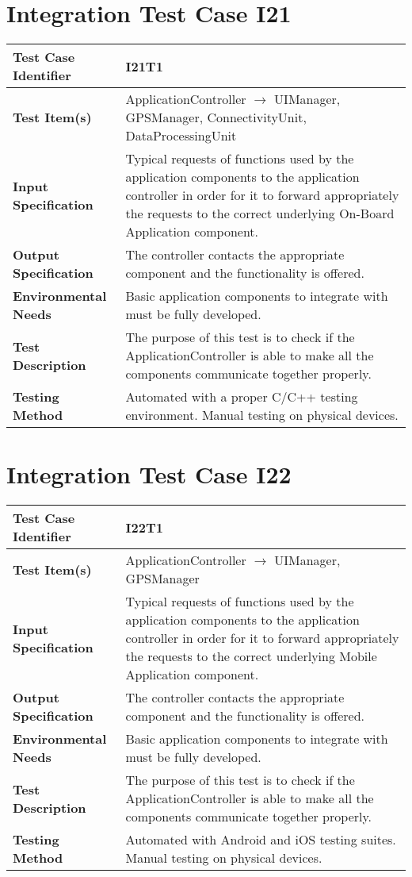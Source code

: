 \section{Integration Test Case I21}\label{testing_c++}

\begin{longtable}{p{} | p{}}
\hline
\textbf{Test Case Identifier} & I21T1\\
\hline
\textbf{Test Item(s)} & ApplicationController $\rightarrow$ UIManager, GPSManager, ConnectivityUnit, DataProcessingUnit  \\
\hline
\textbf{Input Specification} & Typical requests of functions used by the application components to the application controller in order for it to forward appropriately the requests to the correct underlying On-Board Application component. \\
\hline
\textbf{Output Specification} & The controller contacts the appropriate component and the functionality is offered. \\
\hline
\textbf{Environmental Needs} & Basic application components to integrate with must be fully developed. \\
\hline
\textbf{Test Description} & The purpose of this test is to check if the ApplicationController is able to make all the components communicate together properly. \\
\hline
\textbf{Testing Method} & Automated with a proper C/C++ testing environment. Manual testing on physical devices. \\
\hline
\end{longtable}

\section{Integration Test Case I22}

\begin{longtable}{p{} | p{}}
\hline
\textbf{Test Case Identifier} & I22T1\\
\hline
\textbf{Test Item(s)} & ApplicationController  $\rightarrow$ UIManager, GPSManager \\
\hline
\textbf{Input Specification} & Typical requests of functions used by the application components to the application controller in order for it to forward appropriately the requests to the correct underlying Mobile Application component. \\
\hline
\textbf{Output Specification} & The controller contacts the appropriate component and the functionality is offered. \\
\hline
\textbf{Environmental Needs} & Basic application components to integrate with must be fully developed. \\
\hline
\textbf{Test Description} & The purpose of this test is to check if the ApplicationController is able to make all the components communicate together properly. \\
\hline
\textbf{Testing Method} & Automated with Android and iOS testing suites. Manual testing on physical devices. \\
\hline
\end{longtable}

